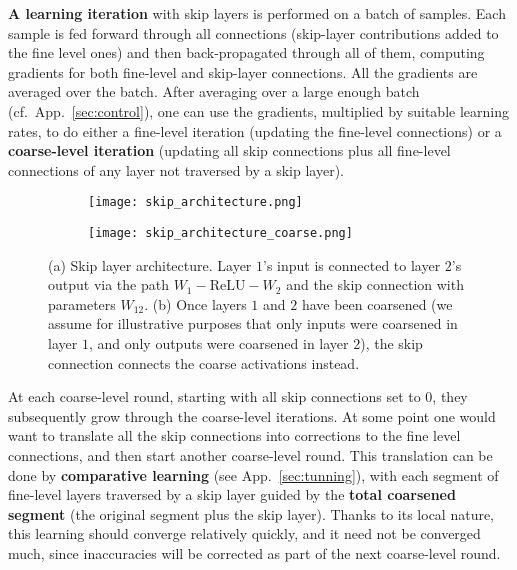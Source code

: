 \documentclass{article} %
\begin{document}
\textbf{A learning iteration} with skip layers is performed on a batch of samples. Each sample is fed forward through all connections (skip-layer contributions added to the fine level ones) and then back-propagated through all of them, computing gradients for both fine-level and skip-layer connections. All the gradients are averaged over the batch. After averaging over a large enough batch (cf.~App.~\ref{sec:control}), one can use the gradients, multiplied by suitable learning rates, to do either a fine-level iteration (updating the fine-level connections) or a \textbf{coarse-level iteration} (updating all  skip connections plus all fine-level connections of any layer not traversed by a skip layer).
\begin{figure}[htbp]
\centering
\begin{subfigure}[b]{0.55\textwidth}
  \texttt{[image: skip\_architecture.png]}
   \caption{}
   \label{fig:skip_architecture} 
\end{subfigure}

\begin{subfigure}[b]{0.55\textwidth}
  \texttt{[image: skip\_architecture\_coarse.png]}
   \caption{}
   \label{fig:skip_architecture_coarse}
\end{subfigure}
\caption[Skip layer architecture.]{(a) Skip layer architecture. Layer $1$'s input is connected to layer $2$'s output via the path $W_1-{\mbox{ReLU}}-W_2$ and the skip connection with parameters $W_{12}$. (b) Once layers $1$ and $2$ have been coarsened (we assume for illustrative purposes that only inputs were coarsened in layer $1$, and only outputs were coarsened in layer $2$), the skip connection connects the coarse activations instead.}
\end{figure}

At each coarse-level round, starting with all skip connections set to $0$, they subsequently grow through the coarse-level iterations. At some point one would want to translate all the skip connections into corrections to the fine level connections, and then start another coarse-level round. This translation can be done by \textbf{comparative learning} (see App.~\ref{sec:tunning}), with each segment of fine-level layers traversed by a skip layer guided by the \textbf{total coarsened segment} (the original segment plus the skip layer). Thanks to its local nature, this learning should converge relatively quickly, and it need not be converged much, since inaccuracies will be corrected as part of the next coarse-level round.
\end{document}
